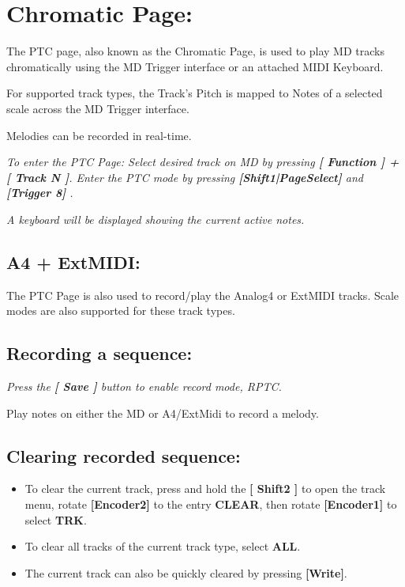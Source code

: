 \chapter{Chromatic Page:}
The PTC page, also known as the Chromatic Page, is used to play MD tracks chromatically using the MD Trigger interface or an attached MIDI Keyboard.


For supported track types, the Track’s Pitch is mapped to Notes of a selected scale across the MD Trigger interface.

Melodies can be recorded in real-time.





\textit{To enter the PTC Page: Select desired track on MD by pressing \textbf{[ Function ] + [ Track N ]}. Enter the PTC mode by pressing \textbf{[Shift1|PageSelect]} and \textbf{[Trigger 8] }.}


\textit{A keyboard will be displayed showing the current active notes.}
\\

	
\section{A4 + ExtMIDI:}
The PTC Page is also used to record/play the Analog4 or ExtMIDI tracks. Scale modes are also supported for these track types.\\

\section{Recording a sequence:}
\textit{Press the \textbf{[ Save ] }button to enable record mode, RPTC.\\}

Play notes on either the MD or A4/ExtMidi to record a melody.

\vspace{-0.3cm}

\section{Clearing recorded sequence:}
\begin{itemize}
\item To clear the current track, press and hold the\textbf{ [ Shift2 ]} to open the track menu, rotate \textbf{[Encoder2]} to the entry \textbf{CLEAR}, then rotate \textbf{[Encoder1]} to select \textbf{TRK}.
\item To clear all tracks of the current track type, select \textbf{ALL}.
\item The current track can also be quickly cleared by pressing \textbf{[Write]}.
\end{itemize}


